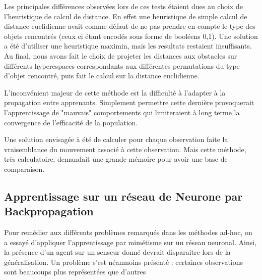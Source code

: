 \documentclass[a4paper, 12pt]{report}
\begin{document}
	
Les principales différences observées lors de ces tests étaient dues au choix de l'heuristique de calcul de distance. En effet une heuristique de simple calcul de distance euclidienne avait comme défaut de ne pas prendre en compte le type des objets rencontrés (ceux ci étant encodés sous forme de booléens 0,1). Une solution a été d'utiliser une heuristique maximin, mais les resultats restaient insuffisants.
Au final, nous avons fait le choix de projeter les distances aux obstacles sur différents hyperespaces correspondants aux différentes permutations du type d'objet rencontré, puis fait le calcul sur la distance euclidienne.

L'inconvénient majeur de cette méthode est la difficulté à l'adapter à la propagation entre apprenants. Simplement permettre cette dernière provoquerait l'apprentissage de "mauvais" comportements qui limiteraient à long terme la convergence de l'efficacité de la population.

Une solution envisagée à été de calculer pour chaque observation faite la vraisemblance du mouvement associé à cette observation. Mais cette méthode, très calculatoire, demandait une grande mémoire pour avoir une base de comparaison.
	
	\subsection{Apprentissage sur un réseau de Neurone par Backpropagation}
	Pour remédier aux différents problèmes remarqués dans les méthodes ad-hoc, on a essayé d'appliquer l'apprentissage par mimétisme sur un réseau neuronal. Ainsi, la présence d'un agent sur un senseur donné devrait disparaitre lors de la généralisation.
	Un problème s'est néanmoins présenté : certaines observations sont beaucoups plus représentées que d'autres
	
\end{document}
